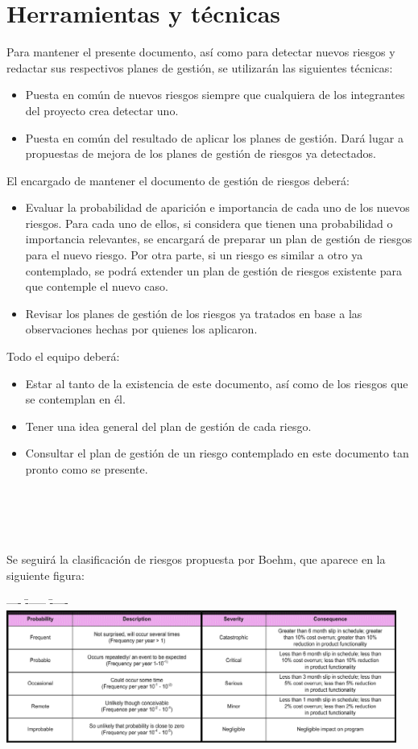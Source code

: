 \chapter{Herramientas y técnicas}
Para mantener el presente documento, así como para detectar nuevos riesgos y redactar sus respectivos planes de gestión, se utilizarán las siguientes técnicas:
	\begin{itemize}
		\item Puesta en común de nuevos riesgos siempre que cualquiera de los integrantes del proyecto crea detectar uno.
		\item Puesta en común del resultado de aplicar los planes de gestión. Dará lugar a propuestas de mejora de los planes de gestión de riesgos ya detectados.\\
	\end{itemize}
	
El encargado de mantener el documento de gestión de riesgos deberá:
	\begin{itemize}
		\item Evaluar la probabilidad de aparición e importancia de cada uno de los nuevos riesgos.	Para cada uno de ellos, si considera que tienen una probabilidad o importancia relevantes, se encargará de preparar un plan de gestión de riesgos para el nuevo riesgo. Por otra parte, si un riesgo es similar a otro ya contemplado, se podrá extender un plan de gestión de riesgos existente para que contemple el nuevo caso.
		\item Revisar los planes de gestión de los riesgos ya tratados en base a las observaciones hechas por quienes los aplicaron.\\
	\end{itemize}
	
Todo el equipo deberá:
	\begin{itemize}
		\item Estar al tanto de la existencia de este documento, así como de los riesgos que se contemplan en él.
		\item Tener una idea general del plan de gestión de cada riesgo.
		\item Consultar el plan de gestión de un riesgo contemplado en este documento tan pronto como se presente.\\
\\
\\
\\
\\
	\end{itemize}
		
Se seguirá la clasificación de riesgos propuesta por Boehm, que aparece en la siguiente figura:\\
\begin{tabbing}
---- \= ------ \= ----- \kill
\>\includegraphics[width=0.96\textwidth]{7.PlanDeGestionDeRiesgos/Imagenes/ClasificacionRiesgosBoehm}
\end{tabbing}